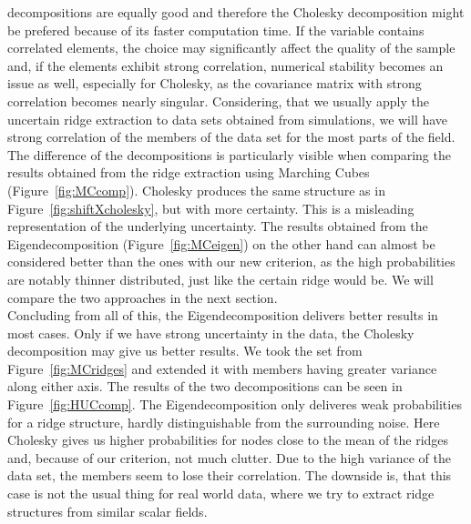 decompositions are equally good and therefore the Cholesky decomposition
might be prefered because of its faster computation time. If the
variable contains correlated elements, the choice may significantly
affect the quality of the sample and, if the elements exhibit strong
correlation, numerical stability becomes an issue as well, especially
for Cholesky, as the covariance matrix with strong correlation becomes
nearly singular. Considering, that we usually apply the uncertain ridge
extraction to data sets obtained from simulations, we will have strong
correlation of the members of the data set for the most parts of the
field. The difference of the decompositions is particularly visible when
comparing the results obtained from the ridge extraction using Marching
Cubes (Figure~\ref{fig:MCcomp}). Cholesky produces the same structure as
in Figure~\ref{fig:shiftXcholesky}, but with more certainty. This is a
misleading representation of the underlying uncertainty. The results
obtained from the Eigendecomposition (Figure~\ref{fig:MCeigen}) on the
other hand can almost be considered better than the ones with our new
criterion, as the high probabilities are notably thinner distributed,
just like the certain ridge would be. We will compare the two approaches
in the next section.\\
\indent Concluding from all of this, the Eigendecomposition delivers
better results in most cases. Only if we have strong uncertainty in the
data, the Cholesky decomposition may give us better results. We took the
set from Figure~\ref{fig:MCridges} and extended it with members having
greater variance along either axis. The results of the two
decompositions can be seen in Figure~\ref{fig:HUCcomp}. The
Eigendecomposition only deliveres weak probabilities for a ridge
structure, hardly distinguishable from the surrounding noise. Here
Cholesky gives us higher probabilities for nodes close to the mean of
the ridges and, because of our criterion, not much clutter. Due to the
high variance of the data set, the members seem to lose their
correlation. The downside is, that this case is not the usual thing for
real world data, where we try to extract ridge structures from similar
scalar fields. 

